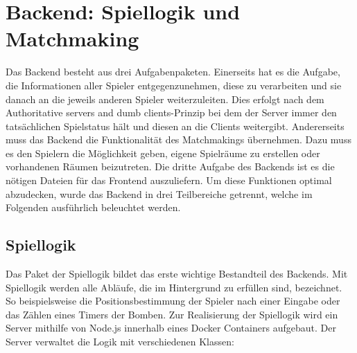 \documentclass[conference]{IEEEtran}
\begin{document}
\section{Backend: Spiellogik und Matchmaking}
Das Backend besteht aus drei Aufgabenpaketen. Einerseits hat es die Aufgabe, die Informationen aller Spieler entgegenzunehmen, diese zu verarbeiten und sie danach an die jeweils anderen Spieler weiterzuleiten. Dies erfolgt nach dem \glqq Authoritative servers and dumb clients\grqq -Prinzip bei dem der Server immer den tatsächlichen Spielstatus hält und diesen an die Clients weitergibt. Andererseits muss das Backend die Funktionalität des Matchmakings übernehmen. Dazu muss es den Spielern die Möglichkeit geben, eigene Spielräume zu erstellen oder vorhandenen Räumen beizutreten. Die dritte Aufgabe des Backends ist es die nötigen Dateien für das Frontend auszuliefern. Um diese Funktionen optimal abzudecken, wurde das Backend in drei Teilbereiche getrennt, welche im Folgenden ausführlich beleuchtet werden.

\subsection{Spiellogik}
Das Paket der Spiellogik bildet das erste wichtige Bestandteil des Backends. Mit Spiellogik werden alle Abläufe, die im Hintergrund zu erfüllen sind, bezeichnet. So beispielsweise die Positionsbestimmung der Spieler nach einer Eingabe oder das Zählen eines Timers der Bomben. Zur Realisierung der Spiellogik wird ein Server mithilfe von Node.js innerhalb eines Docker Containers aufgebaut. Der Server verwaltet die Logik mit verschiedenen Klassen:
\end{document}
